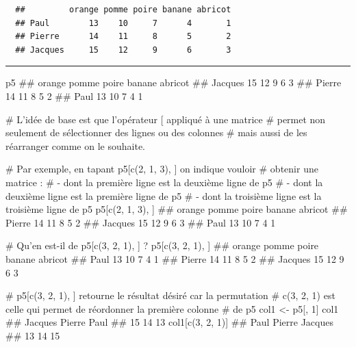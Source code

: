 \documentclass[12pt,twosided, notitlepage]{book}
\newenvironment{Shaded}{}{}
\newcommand{\CommentTok}[1]{\textcolor[rgb]{0.00,0.50,0.00}{#1}}
\newcommand{\DecValTok}[1]{#1}
\newcommand{\KeywordTok}[1]{\textcolor[rgb]{0.00,0.00,1.00}{#1}}
\newcommand{\NormalTok}[1]{#1}
\newcommand{\StringTok}[1]{\textcolor[rgb]{0.00,0.50,0.50}{#1}}
\newif \ifsol
\renewenvironment{Shaded}{\begin{snugshade}}{\end{snugshade}}
\begin{document}
\begin{enumerate}
\begin{verbatim}
  ##         orange pomme poire banane abricot
  ## Paul        13    10     7      4       1
  ## Pierre      14    11     8      5       2
  ## Jacques     15    12     9      6       3
\end{verbatim}

  \ifsol  \textbf{Indication} Que vaut \texttt{p5{[}c(3,\ 2,\ 1),\ {]}}
  ? Comment utiliser la fonction \texttt{order()} pour automatiser cette
  opération ?\fi  \ifsol 

  \begin{center} \rule{0.5\linewidth}{\linethickness}\end{center}

\begin{Shaded}
\begin{Highlighting}[]
\NormalTok{p5}
\NormalTok{  ##         orange pomme poire banane abricot}
\NormalTok{  ## Jacques     15    12     9      6       3}
\NormalTok{  ## Pierre      14    11     8      5       2}
\NormalTok{  ## Paul        13    10     7      4       1}

\CommentTok{# L'idée de base est que l'opérateur [ appliqué à une matrice}
\CommentTok{# permet non seulement de sélectionner des lignes ou des colonnes}
\CommentTok{# mais aussi de les réarranger comme on le souhaite.}

\CommentTok{# Par exemple, en tapant p5[c(2, 1, 3), ] on indique vouloir}
\CommentTok{# obtenir une matrice : }
\CommentTok{# - dont la première ligne est la deuxième ligne de p5}
\CommentTok{# - dont la deuxième ligne est la première ligne de p5}
\CommentTok{# - dont la troisième ligne est la troisième ligne de p5}
\NormalTok{p5[}\KeywordTok{c}\NormalTok{(}\DecValTok{2}\NormalTok{, }\DecValTok{1}\NormalTok{, }\DecValTok{3}\NormalTok{), ]}
\NormalTok{  ##         orange pomme poire banane abricot}
\NormalTok{  ## Pierre      14    11     8      5       2}
\NormalTok{  ## Jacques     15    12     9      6       3}
\NormalTok{  ## Paul        13    10     7      4       1}

\CommentTok{# Qu'en est-il de p5[c(3, 2, 1), ] ? }
\NormalTok{p5[}\KeywordTok{c}\NormalTok{(}\DecValTok{3}\NormalTok{, }\DecValTok{2}\NormalTok{, }\DecValTok{1}\NormalTok{), ]}
\NormalTok{  ##         orange pomme poire banane abricot}
\NormalTok{  ## Paul        13    10     7      4       1}
\NormalTok{  ## Pierre      14    11     8      5       2}
\NormalTok{  ## Jacques     15    12     9      6       3}

\CommentTok{# p5[c(3, 2, 1), ] retourne le résultat désiré car la permutation}
\CommentTok{# c(3, 2, 1) est celle qui permet de réordonner la première colonne}
\CommentTok{# de p5}
\NormalTok{col1 <-}\StringTok{ }\NormalTok{p5[, }\DecValTok{1}\NormalTok{]}
\NormalTok{col1}
\NormalTok{  ## Jacques  Pierre    Paul }
\NormalTok{  ##      15      14      13}
\NormalTok{col1[}\KeywordTok{c}\NormalTok{(}\DecValTok{3}\NormalTok{, }\DecValTok{2}\NormalTok{, }\DecValTok{1}\NormalTok{)]}
\NormalTok{  ##    Paul  Pierre Jacques }
\NormalTok{  ##      13      14      15}


\end{Highlighting}
\end{Shaded}
\end{enumerate}
\end{document}
